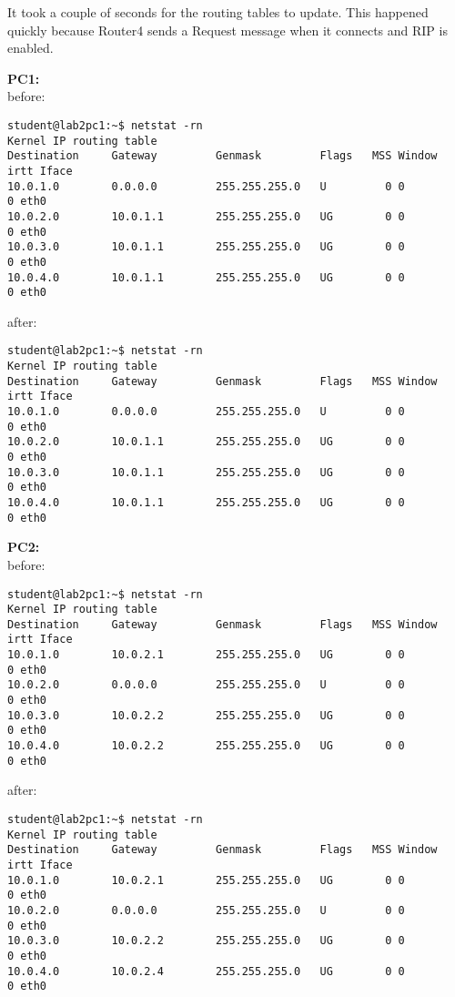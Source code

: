It took a couple of seconds for the routing tables to update. This happened quickly because Router4 sends a Request message when it connects and RIP is enabled.

\textbf{PC1:}\\
before:
\begin{lstlisting}
student@lab2pc1:~$ netstat -rn
Kernel IP routing table
Destination     Gateway         Genmask         Flags   MSS Window  irtt Iface
10.0.1.0        0.0.0.0         255.255.255.0   U         0 0          0 eth0
10.0.2.0        10.0.1.1        255.255.255.0   UG        0 0          0 eth0
10.0.3.0        10.0.1.1        255.255.255.0   UG        0 0          0 eth0
10.0.4.0        10.0.1.1        255.255.255.0   UG        0 0          0 eth0
\end{lstlisting}
after:
\begin{lstlisting}
student@lab2pc1:~$ netstat -rn
Kernel IP routing table
Destination     Gateway         Genmask         Flags   MSS Window  irtt Iface
10.0.1.0        0.0.0.0         255.255.255.0   U         0 0          0 eth0
10.0.2.0        10.0.1.1        255.255.255.0   UG        0 0          0 eth0
10.0.3.0        10.0.1.1        255.255.255.0   UG        0 0          0 eth0
10.0.4.0        10.0.1.1        255.255.255.0   UG        0 0          0 eth0
\end{lstlisting}

\textbf{PC2:}\\
before:
\begin{lstlisting}
student@lab2pc1:~$ netstat -rn
Kernel IP routing table
Destination     Gateway         Genmask         Flags   MSS Window  irtt Iface
10.0.1.0        10.0.2.1        255.255.255.0   UG        0 0          0 eth0
10.0.2.0        0.0.0.0         255.255.255.0   U         0 0          0 eth0
10.0.3.0        10.0.2.2        255.255.255.0   UG        0 0          0 eth0
10.0.4.0        10.0.2.2        255.255.255.0   UG        0 0          0 eth0
\end{lstlisting}
after:
\begin{lstlisting}
student@lab2pc1:~$ netstat -rn
Kernel IP routing table
Destination     Gateway         Genmask         Flags   MSS Window  irtt Iface
10.0.1.0        10.0.2.1        255.255.255.0   UG        0 0          0 eth0
10.0.2.0        0.0.0.0         255.255.255.0   U         0 0          0 eth0
10.0.3.0        10.0.2.2        255.255.255.0   UG        0 0          0 eth0
10.0.4.0        10.0.2.4        255.255.255.0   UG        0 0          0 eth0
\end{lstlisting}

